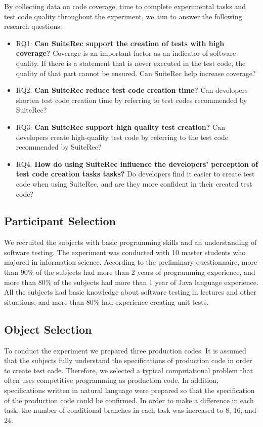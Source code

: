 \documentclass[conference]{IEEEtran}
\begin{document}
By collecting data on code coverage, time to complete experimental tasks and test code quality throughout the experiment, we aim to answer the following research questions:


\begin{itemize}
\item RQ1: \textbf{Can SuiteRec support the creation of tests with high coverage?} Coverage is an important factor as an indicator of software quality. If there is a statement that is never executed in the test code, the quality of that part cannot be ensured. Can SuiteRec help increase coverage?
\item RQ2: \textbf{Can SuiteRec reduce test code creation time?} Can developers shorten test code creation time by referring to test codes recommended by SuiteRec?
\item RQ3: \textbf{Can SuiteRec support high quality test creation?} Can developers create high-quality test code by referring to the test code recommended by SuiteRec?
\item RQ4: \textbf{How do using SuiteRec influence the developers’ perception of test code creation tasks tasks? } Do developers find it easier to create test code when using SuiteRec, and are they more confident in their created test code?
\end{itemize}

\subsection{Participant Selection}
We recruited the subjects with basic programming skills and an understanding of software testing. The experiment was conducted with 10 master students who majored in information science. According to the preliminary questionnaire, more than 90\% of the subjects had more than 2 years of programming experience, and more than 80\% of the subjects had more than 1 year of Java language experience. All the subjects had basic knowledge about software testing in lectures and other situations, and more than 80\% had experience creating unit tests.

\subsection{Object Selection}
To conduct the experiment we prepared three production codes. It is assumed that the subjects fully understand the specifications of production code in order to create test code. Therefore, we selected a typical computational problem that often uses competitive programming as production code. In addition, specifications written in natural language were prepared so that the specification of the production code could be confirmed. In order to make a difference in each task, the number of conditional branches in each task was increased to 8, 16, and 24.
\end{document}

